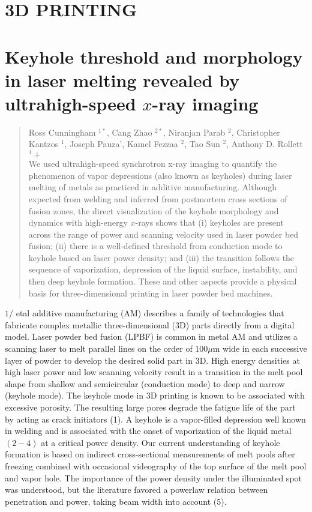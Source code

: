 \documentclass[10pt]{article}
\begin{document}
\section*{3D PRINTING}
\section*{Keyhole threshold and morphology in laser melting revealed by ultrahigh-speed $x$-ray imaging}
\begin{abstract}
Ross Cunningham ${ }^{1 *}$, Cang Zhao ${ }^{2 *}$, Niranjan Parab ${ }^{2}$, Christopher Kantzos ${ }^{1}$, Joseph Pauza', Kamel Fezzaa ${ }^{2}$, Tao Sun ${ }^{2}$, Anthony D. Rollett ${ }^{1}+$\\
We used ultrahigh-speed synchrotron x-ray imaging to quantify the phenomenon of vapor depressions (also known as keyholes) during laser melting of metals as practiced in additive manufacturing. Although expected from welding and inferred from postmortem cross sections of fusion zones, the direct visualization of the keyhole morphology and dynamics with high-energy $x$-rays shows that (i) keyholes are present across the range of power and scanning velocity used in laser powder bed fusion; (ii) there is a well-defined threshold from conduction mode to keyhole based on laser power density; and (iii) the transition follows the sequence of vaporization, depression of the liquid surface, instability, and then deep keyhole formation. These and other aspects provide a physical basis for three-dimensional printing in laser powder bed machines.
\end{abstract}

$1 /$ etal additive manufacturing (AM) describes a family of technologies that fabricate complex metallic three-dimensional (3D) parts directly from a digital model. Laser powder bed fusion (LPBF) is common in metal AM and utilizes a scanning laser to melt parallel lines on the order of $100 \mu \mathrm{m}$ wide in each successive layer of powder to develop the desired solid part in 3D. High energy densities at high laser power and low scanning velocity result in a transition in the melt pool shape from shallow and semicircular (conduction mode) to deep and narrow (keyhole mode). The keyhole mode in 3D printing is known to be associated with excessive porosity. The resulting large pores degrade the fatigue life of the part by acting as crack initiators (1). A keyhole is a vapor-filled depression well known in welding and is associated with the onset of vaporization of the liquid metal $(2-4)$ at a critical power density. Our current understanding of keyhole formation is based on indirect cross-sectional measurements of melt pools after freezing combined with occasional videography of the top surface of the melt pool and vapor hole. The importance of the power density under the illuminated spot was understood, but the literature favored a powerlaw relation between penetration and power, taking beam width into account (5).
\end{document}
